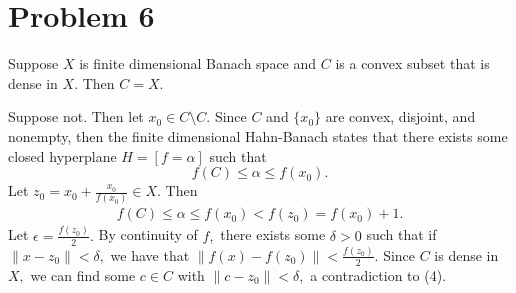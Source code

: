 \documentclass[11pt]{article}
\begin{document}
\section*{Problem 6}
\begin{problem}
    Suppose $X$ is finite dimensional Banach space and $C$ is a convex subset that is dense in $X.$ Then $C = X.$
\end{problem}
\begin{solution}
    Suppose not. Then let $x_0 \in C\setminus C.$ Since $C$ and $\{x_0\}$ are convex, disjoint, and nonempty, then the finite dimensional Hahn-Banach states that there exists some closed hyperplane $H = [f = \alpha]$ such that 
    \[f(C) \leq \alpha \leq f(x_0).\] Let $z_0 = x_0 + \frac{x_0}{f(x_0)}\in X.$ Then 
    \begin{align}
    f(C) \leq \alpha \leq f(x_0) < f(z_0) = f(x_0) + 1.  
    \end{align}
     Let $\epsilon = \frac{f(z_0)}{2}.$ By continuity of $f,$ there exists some $\delta>0$ such that if $\|x-z_0\| < \delta,$ we have that $\|f(x) - f(z_0)\|< \frac{f(z_0)}{2}.$ Since $C$ is dense in $X,$ we can find some $c \in C$ with $\|c - z_0\|< \delta,$ a contradiction to (4).
\end{solution}

\newpage
\end{document}
